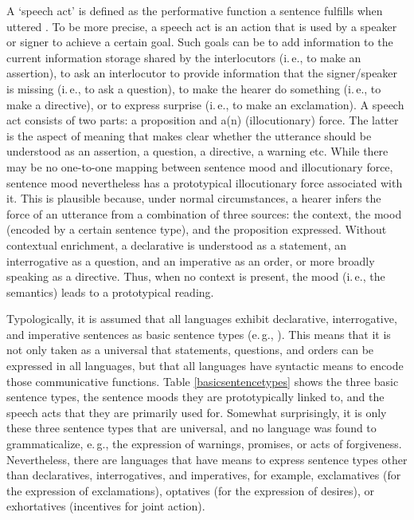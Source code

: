 \noindent A `speech act' is defined as the performative function a sentence fulfills when uttered \citep{austin1962things}. To be more precise, a speech act is an action that is used by a speaker or signer to achieve a certain goal. Such goals can be to add information to the current information storage shared by the interlocutors (i.\,e., to make an assertion), to ask an interlocutor to provide information that the signer/speaker is missing (i.\,e., to ask a question), to make the hearer do something (i.\,e., to make a directive), or to express surprise (i.\,e., to make an exclamation). A speech act consists of two parts: a proposition and a(n) (illocutionary) force. The latter is the aspect of meaning that makes clear whether the utterance should be understood as an assertion, a question, a directive, a warning etc. While there may be no one-to-one mapping between sentence mood and illocutionary force, sentence mood nevertheless has a prototypical illocutionary force associated with it. This is plausible because, under normal circumstances, a hearer infers the force of an utterance from a combination of three sources:\label{threesources} the context, the mood (encoded by a certain sentence type), and the proposition expressed. Without contextual enrichment, a declarative is understood as a statement, an interrogative as a question, and an imperative as an order, or more broadly speaking as a directive. Thus, when no context is present, the mood (i.\,e., the semantics) leads to a prototypical reading.


Typologically, it is assumed that all languages exhibit declarative, interrogative, and imperative sentences as basic sentence types (e.\,g., \citealt{lyons1977semantics, sadock1985speech}). This means that it is not only taken as a universal that statements, questions, and orders can be expressed in all languages, but that all languages have syntactic means to encode those communicative functions. Table \ref{basicsentencetypes} shows the three basic sentence types, the sentence moods they are prototypically linked to, and the speech acts that they are primarily used for. Somewhat surprisingly, it is only these three sentence types that are universal, and no language was found to grammaticalize, e.\,g., the expression of warnings, promises, or acts of forgiveness. Nevertheless, there are languages that have means to express sentence types other than declaratives, interrogatives, and imperatives, for example, exclamatives (for the expression of exclamations), optatives (for the expression of desires), or exhortatives (incentives for joint action).

